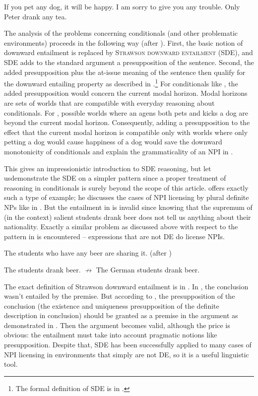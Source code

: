 \documentclass[output=paper,colorlinks,citecolor=brown]{langscibook}
\begin{document}
\ea\label{ex:16}\ea If you pet any dog, it will be happy.
\ex I am sorry to give you any trouble.
\ex Only Peter drank any tea.
\z
\z

\noindent The analysis of the problems concerning conditionals (and other problematic environments) proceeds in the following way (after \citealt{von1999npi}). First, the basic notion of downward entailment is replaced by \textsc{Strawson downward entailment} (SDE), and SDE adds to the standard argument a presupposition of the sentence. Second, the added presupposition plus the at-issue meaning of the sentence then qualify for the downward entailing property as described in .\footnote{The formal definition of SDE is in .}
For conditionals like , the added presupposition would concern the current modal horizon. Modal horizons are sets of worlds that are compatible with everyday reasoning about conditionals. For , possible worlds where an agens both pets and kicks a dog are beyond the current modal horizon. Consequently, adding a presupposition to the effect that the current modal horizon is compatible only with worlds where only petting a dog would cause happiness of a dog would save the downward monotonicity of conditionals and explain the grammaticality of an NPI in . 

This gives an impressionistic introduction to SDE reasoning, but let us\linebreak demonstrate the SDE on a simpler pattern since a proper treatment of reasoning in conditionals is surely beyond the scope of this article. \citet{gajewski_another_2016} offers exactly such a type of example; he discusses the cases of NPI licensing by plural definite NPs like in . But the entailment in  is invalid since knowing that the supremum of (in the context) salient students drank beer does not tell us anything about their nationality. Exactly a similar problem as discussed above with respect to the pattern in  is encountered  -- expressions that are not DE do license NPIs.

\ea\label{ex:17} The students who have any beer are sharing it. \hfill (after \citealt[ex. 2]{gajewski_another_2016})
\z

\ea\label{ex:18} The students drank beer. $\not\rightarrow$ The German students drank beer. 
\z

\noindent The exact definition of Strawson downward entailment is in . In , the conclusion wasn't entailed by the premise. But according to , the presupposition of the conclusion (the existence and uniqueness presupposition of the definite description in conclusion) should be granted as a premise in the argument as demonstrated in . Then the argument becomes valid, although the price is obvious: the entailment must take into account pragmatic notions like presupposition. Despite that, SDE has been successfully applied to many cases of NPI licensing in environments that simply are not DE, so it is a useful linguistic tool.
\end{document}
